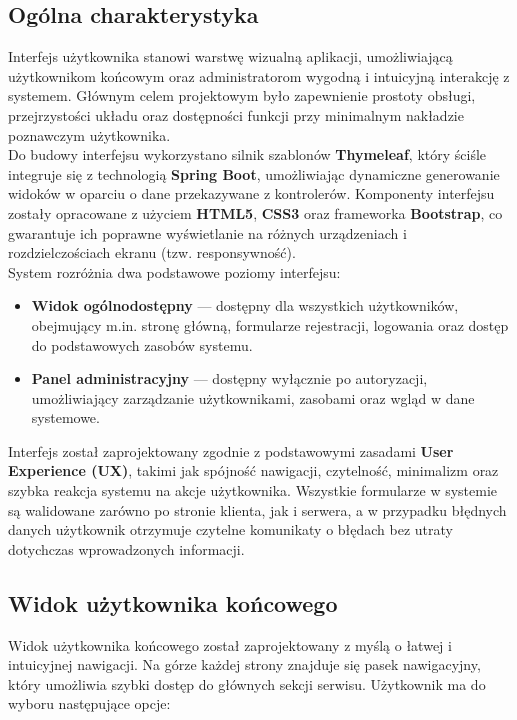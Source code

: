 \documentclass[12pt]{article}
\begin{document}
\subsection{Ogólna charakterystyka}
	
	Interfejs użytkownika stanowi warstwę wizualną aplikacji, umożliwiającą użytkownikom końcowym oraz administratorom wygodną i intuicyjną interakcję z systemem. Głównym celem projektowym było zapewnienie prostoty obsługi, przejrzystości układu oraz dostępności funkcji przy minimalnym nakładzie poznawczym użytkownika.\\
	Do budowy interfejsu wykorzystano silnik szablonów \textbf{Thymeleaf}, który ściśle integruje się z technologią \textbf{Spring Boot}, umożliwiając dynamiczne generowanie widoków w oparciu o dane przekazywane z kontrolerów. Komponenty interfejsu zostały opracowane z użyciem \textbf{HTML5}, \textbf{CSS3} oraz frameworka \textbf{Bootstrap}, co gwarantuje ich poprawne wyświetlanie na różnych urządzeniach i rozdzielczościach ekranu (tzw. responsywność).\\
	System rozróżnia dwa podstawowe poziomy interfejsu:
	\begin{itemize}
		\item \textbf{Widok ogólnodostępny} --- dostępny dla wszystkich użytkowników, obejmujący m.in. stronę główną, formularze rejestracji, logowania oraz dostęp do podstawowych zasobów systemu.
		\item \textbf{Panel administracyjny} --- dostępny wyłącznie po autoryzacji, umożliwiający zarządzanie użytkownikami, zasobami oraz wgląd w dane systemowe.
	\end{itemize}
	Interfejs został zaprojektowany zgodnie z podstawowymi zasadami \textbf{User Experience (UX)}, takimi jak spójność nawigacji, czytelność, minimalizm oraz szybka reakcja systemu na akcje użytkownika. Wszystkie formularze w systemie są walidowane zarówno po stronie klienta, jak i serwera, a w przypadku błędnych danych użytkownik otrzymuje czytelne komunikaty o błędach bez utraty dotychczas wprowadzonych informacji.
	
	
	\subsection{Widok użytkownika końcowego}
	
	Widok użytkownika końcowego został zaprojektowany z myślą o łatwej i intuicyjnej nawigacji. Na górze każdej strony znajduje się pasek nawigacyjny, który umożliwia szybki dostęp do głównych sekcji serwisu. Użytkownik ma do wyboru następujące opcje:
	
\end{document}
